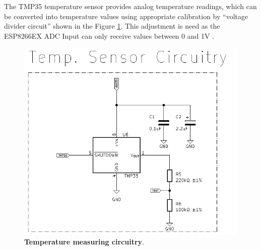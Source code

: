 The TMP35 temperature sensor \cite{TMP35} provides analog temperature readings, which can be converted into temperature values using appropriate 
calibration by ``voltage divider circuit'' shown in the Figure \ref{02fig:temperatureSensorCircuitry}. This adjustment is need as the 
ESP8266EX ADC Input can only receive values between 0 and 1V \cite{ESP8266EX}.

\begin{figure}[H]
    \centering
    \includegraphics[scale = 0.6]{imagens/temperatureSensorCircuitry.png}
    \caption{\textbf{Temperature measuring circuitry}.}
    \label{02fig:temperatureSensorCircuitry}
\end{figure}














